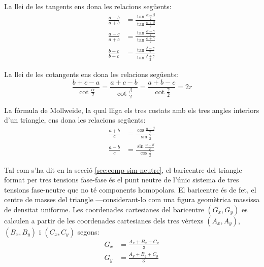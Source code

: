 La llei de les tangents ens dona les relacions següents:
\begin{subequations}
\begin{align}
    \frac{a-b}{a+b} &= \frac{\tan\frac{\alpha-\beta}{2}}{\tan\frac{\alpha+\beta}{2}} \\[1ex]
    \frac{a-c}{a+c} &= \frac{\tan\frac{\alpha-\gamma}{2}}{\tan\frac{\alpha+\gamma}{2}} \\[1ex]
    \frac{b-c}{b+c} &= \frac{\tan\frac{\beta-\gamma}{2}}{\tan\frac{\beta+\gamma}{2}}
\end{align}
\end{subequations}

La llei de les cotangents ens dona les relacions següents:
\begin{equation}
    \frac{b+c-a}{\cot\frac{\alpha}{2}} = \frac{a+c-b}{\cot\frac{\beta}{2}} =
    \frac{a+b-c}{\cot\frac{\gamma}{2}} = 2 r
\end{equation}

La fórmula de Mollweide, la qual lliga els tres costats amb els tres angles interiors d'un triangle, ens dona les relacions següents:
\begin{subequations}
\begin{align}
    \frac{a+b}{c} &= \frac{\cos\frac{\alpha-\beta}{2}}{\sin\frac{\gamma}{2}} \\[1ex]
    \frac{a-b}{c} &= \frac{\sin\frac{\alpha-\beta}{2}}{\cos\frac{\gamma}{2}}
\end{align}
\end{subequations}

Tal com s'ha dit en la secció \vref{sec:comp-sim-neutre}, el baricentre del triangle format per tres tensions fase-fase és el punt neutre de l'únic sistema de tres tensions fase-neutre que no té components homopolars. El baricentre és de fet, el centre de masses del triangle ---considerant-lo com una figura geomètrica massissa de densitat uniforme.  Les coordenades cartesianes del baricentre $(G_x,G_y)$ es calculen a partir de les coordenades cartesianes dels tres vèrtexs $(A_x,A_y)$, $(B_x,B_y)$ i $(C_x,C_y)$ segons:
\begin{subequations}
\begin{align}
    G_x &= \frac{A_x + B_x + C_x}{3} \label{eq:bari_x}\\[1ex]
    G_y &= \frac{A_y + B_y + C_y}{3} \label{eq:bari_y}
\end{align}
\end{subequations}

